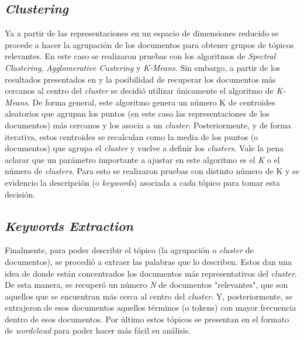 \subsection{\textit{Clustering}}

Ya a partir de las representaciones en un espacio de dimensiones reducido se procede a hacer la agrupación de los documentos para obtener grupos de tópicos relevantes. En este caso se realizaron pruebas con los algoritmos de \textit{Spectral Clustering}, \textit{Agglomerative Custering} y \textit{K-Means}. Sin embargo, a partir de los resultados presentados en \cite{DeepRepresentationClusteringTweets} y la posibilidad de recuperar los documentos más cercanos al centro del \textit{cluster} se decidió utilizar únicamente el algoritmo de \textit{K-Means}. De forma general, este algoritmo genera un número K de centroides aleatorios que agrupan los puntos (en este caso las representaciones de los documentos) más cercanos y los asocia a un \textit{cluster}. Posteriormente, y de forma iterativa, estos centroides se recalculan como la media de los puntos (o documentos) que agrupa el \textit{cluster} y vuelve a definir los \textit{clusters}. Vale la pena aclarar que un parámetro importante a ajustar en este algoritmo es el \textit{K} o el número de \textit{clusters}. Para esto se realizaron pruebas con distinto número de K y se evidencio la descripción (o \textit{keywords}) asociada a cada tópico para tomar esta decisión.

\subsection{\textit{Keywords Extraction}}

Finalmente, para poder describir el tópico (la agrupación o \textit{cluster} de documentos), se procedió a extraer las palabras que lo describen. Estos dan una idea de donde están concentrados los documentos más representativos del \textit{cluster}. De esta manera, se recuperó un número \textit{N} de documentos "relevantes", que son aquellos que se encuentran más cerca al centro del \textit{cluster}. Y, posteriormente, se extrajeron de esos documentos aquellos términos (o tokens) con mayor frecuencia dentro de esos documentos. Por último estos tópicos se presentan en el formato de \textit{wordcloud} para poder hacer más fácil su análisis.
